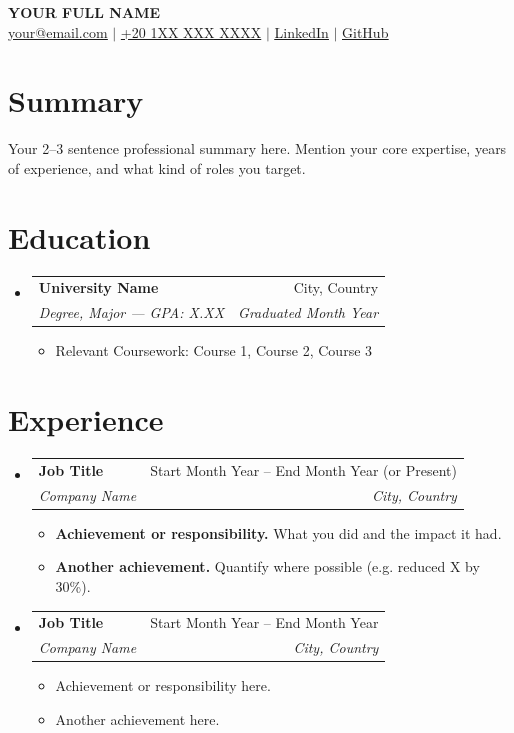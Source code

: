 \documentclass[letterpaper,10pt]{article}
\makeatletter
\newcommand{\resumeItem}[1]{
  \item\small{
    {#1 \vspace{-2pt}}
  }
}
\newcommand{\resumeSubheading}[4]{
  \vspace{-2pt}\item
    \begin{tabular*}{0.97\textwidth}[t]{l@{\extracolsep{\fill}}r}
      \textbf{#1} & #2 \\
      \textit{\small #3} & \textit{\small #4} \\
    \end{tabular*}\vspace{-7pt}
}
\newcommand{\resumeSubHeadingListStart}{\begin{itemize}[leftmargin=0.15in, label={}]}
\newcommand{\resumeSubHeadingListEnd}{\end{itemize}}
\newcommand{\resumeItemListStart}{\begin{itemize}}
\newcommand{\resumeItemListEnd}{\end{itemize}\vspace{-5pt}}
\makeatother
\begin{document}
\begin{center}
    \textbf{\huge \scshape YOUR FULL NAME} \\ \vspace{1pt}
    \small
    \href{mailto:your@email.com}{\underline{your@email.com}} $|$
    \href{tel:+201XXXXXXXXX}{+20 1XX XXX XXXX} $|$
    \href{https://linkedin.com/in/yourprofile}{\underline{LinkedIn}} $|$
    \href{https://github.com/yourusername}{\underline{GitHub}}
\end{center}

\section{Summary}
Your 2--3 sentence professional summary here. Mention your core expertise,
years of experience, and what kind of roles you target.

\section{Education}
  \resumeSubHeadingListStart
    \resumeSubheading
      {University Name}{City, Country}
      {Degree, Major — GPA: X.XX}{Graduated Month Year}
        \resumeItemListStart
          \resumeItem{Relevant Coursework: Course 1, Course 2, Course 3}
        \resumeItemListEnd
  \resumeSubHeadingListEnd

\section{Experience}
  \resumeSubHeadingListStart

    \resumeSubheading
      {Job Title}{Start Month Year -- End Month Year (or Present)}
      {Company Name}{City, Country}
      \resumeItemListStart
        \resumeItem{\textbf{Achievement or responsibility.} What you did and the impact it had.}
        \resumeItem{\textbf{Another achievement.} Quantify where possible (e.g. reduced X by 30\%).}
      \resumeItemListEnd

    \resumeSubheading
      {Job Title}{Start Month Year -- End Month Year}
      {Company Name}{City, Country}
      \resumeItemListStart
        \resumeItem{Achievement or responsibility here.}
        \resumeItem{Another achievement here.}
      \resumeItemListEnd

  \resumeSubHeadingListEnd

\end{document}
